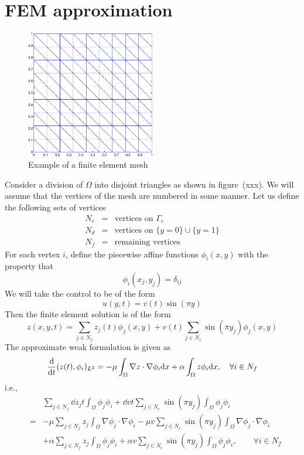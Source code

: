 \documentclass[12pt]{article}
\begin{document}
\section{FEM approximation}
\begin{figure}
\begin{center}
\includegraphics[width=0.5\textwidth]{heat2d_mesh}
\caption{Example of a finite element mesh}
\end{center}
\end{figure}
Consider a division of $\Omega$ into disjoint triangles as shown in figure~(xxx). We will assume that the vertices of the mesh are numbered in some manner. Let us define the following sets of vertices
\begin{eqnarray*}
N_c &=& \mbox{vertices on $\Gamma_c$} \\
N_d &=& \mbox{vertices on } \{y=0\} \cup \{y=1\} \\
N_f &=& \mbox{remaining vertices}
\end{eqnarray*}
For each vertex $i$, define the piecewise affine functions $\phi_i(x,y)$ with the property that
\[
\phi_i(x_j, y_j) = \delta_{ij}
\]
We will take the control to be of the form
\[
u(y,t) = v(t) \sin(\pi y)
\]
Then the finite element solution is of the form
\[
z(x,y,t) = \sum_{j \in N_f} z_j(t) \phi_j(x,y) + v(t) \sum_{j \in N_c} \sin(\pi y_j) \phi_j(x,y)
\]
The approximate weak formulation is given as
\[
 \frac{\textrm{d} }{\textrm{d} t}(z(t), \phi_i)_{L^2} = - \mu \int_\Omega \nabla z \cdot \nabla \phi_i \textrm{d} x +  \alpha \int_\Omega z \phi_i \textrm{d} x, \quad \forall i \in N_f
\]
i.e.,
\begin{eqnarray*}
&& \sum_{j \in N_f} \dd{z_j}{t} \int_\Omega \phi_j \phi_i + \dd{v}{t} \sum_{j \in N_c} \sin(\pi y_j) \int_\Omega \phi_j \phi_i \\
&=& -\mu \sum_{j \in N_f} z_j \int_\Omega \nabla \phi_j \cdot \nabla \phi_i - \mu v \sum_{j \in N_c} \sin(\pi y_j) \int_\Omega \nabla \phi_j \cdot \nabla \phi_i \\
&& + \alpha \sum_{j \in N_f} z_j \int_\Omega \phi_j \phi_i + \alpha v \sum_{j \in N_c} \sin(\pi y_j) \int_\Omega \phi_j \phi_i, \qquad \forall i \in N_f
\end{eqnarray*}
\end{document}
